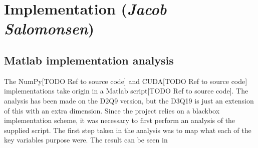 \section{Implementation (\textit{Jacob Salomonsen})}


\subsection{Matlab implementation analysis}
The NumPy[TODO Ref to source code] and CUDA[TODO Ref to source code] implementations take origin in a Matlab script[TODO Ref to source code]. The analysis has been made on the D2Q9 version, but the D3Q19 is just an extension of this with an extra dimension. Since the project relies on a blackbox implementation scheme, it was necessary to first perform an analysis of the supplied script. The first step taken in the analysis was to map what each of the key variables purpose were. The result can be seen in 

